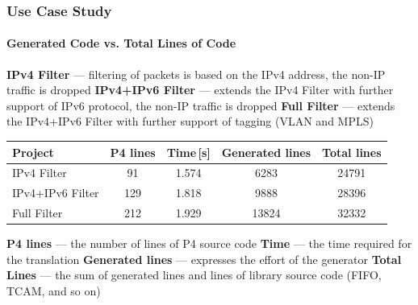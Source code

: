 \begin{frame}
    \frametitle{Use Case Study}
    \framesubtitle{Generated Code vs. Total Lines of Code}
    
    \begin{enumerate}
        \fitem \textbf{IPv4 Filter} --- filtering of packets is based on the IPv4 address, the non-IP traffic is dropped
        \fitem \textbf{IPv4+IPv6 Filter}  --- extends the IPv4 Filter with further support of IPv6 protocol, the non-IP traffic is dropped
        \fitem \textbf{Full Filter} --- extends the IPv4+IPv6 Filter with further support of tagging (VLAN and MPLS)
    \end{enumerate}
    
    
    \begin{table}
        \footnotesize
        \centering
        \begin{tabular}{|l||c|c||c|c|}
            \hline
            \T \textbf{Project} & \textbf{P4 lines} & \textbf{Time\,[s]} & \textbf{Generated lines} & \textbf{Total lines} \\ \hline\hline
            \T IPv4 Filter      &        91         &       1.574        &           6283           &        24791         \\
            IPv4+IPv6 Filter    &        129        &       1.818        &           9888           &        28396         \\
            Full Filter         &        212        &       1.929        &          13824           &        32332         \\ \hline
        \end{tabular}
    \end{table}
    
    \begin{itemize}
        \footnotesize
        \fitem \textbf{P4 lines} --- the number of lines of P4 source code
        \fitem \textbf{Time} --- the time required for the translation
        \fitem \textbf{Generated lines} --- expresses the effort of the generator
        \fitem \textbf{Total Lines} ---  the sum of generated lines and lines of library source code (FIFO, TCAM, and so on)
    \end{itemize}
\end{frame}

